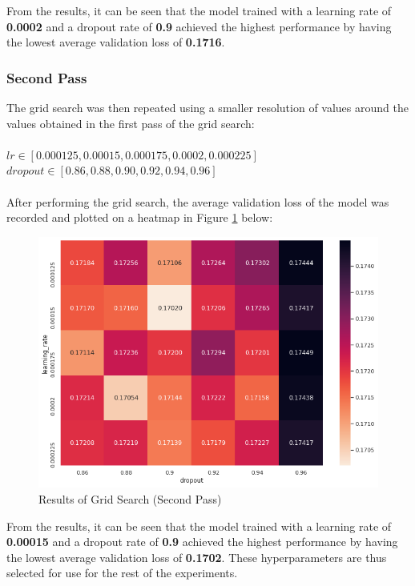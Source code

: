 \documentclass[sigconf,nonacm=true]{acmart}
\begin{document}
From the results, it can be seen that the model trained with a learning rate of \textbf{0.0002} and 
a dropout rate of \textbf{0.9} achieved the highest performance by having the lowest average
validation loss of \textbf{0.1716}.

\subsubsection{Second Pass}
The grid search was then repeated using a smaller resolution of values around the values obtained in the first pass 
of the grid search:\\\\
$lr \in [0.000125, 0.00015, 0.000175, 0.0002, 0.000225]$\\
$dropout \in [0.86, 0.88, 0.90, 0.92, 0.94, 0.96]$\\\\

After performing the grid search, the average validation loss of the model was recorded and plotted 
on a heatmap in Figure \ref{fig:gridsearch2} below:

\begin{figure}[H]
	\centering
	\includegraphics[width=\linewidth]{fig/gridsearch2.png}
	\caption{Results of Grid Search (Second Pass)}
	\label{fig:gridsearch2}
\end{figure}

From the results, it can be seen that the model trained with a learning rate of \textbf{0.00015} and 
a dropout rate of \textbf{0.9} achieved the highest performance by having the lowest average
validation loss of \textbf{0.1702}. These hyperparameters are thus selected for use for the rest of the
experiments.
\end{document}
